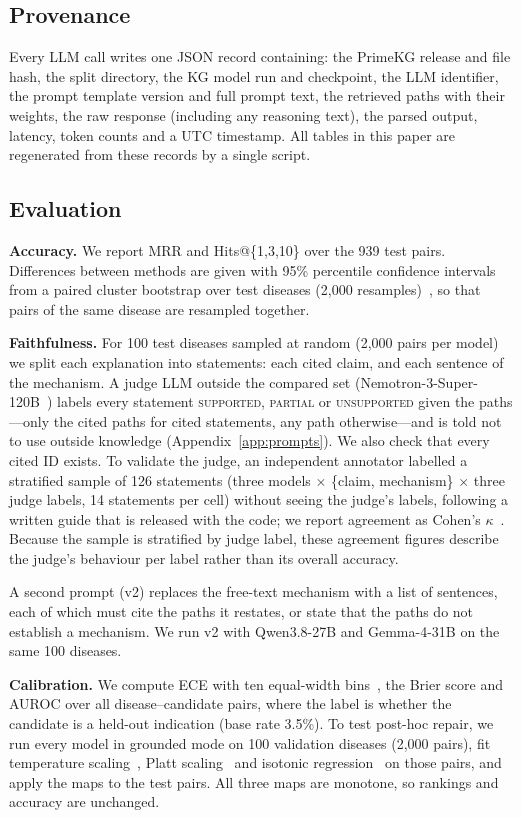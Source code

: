 \documentclass[electronics,article,submit]{Definitions/mdpi}
\begin{document}
\subsection{Provenance}
Every LLM call writes one JSON record containing: the PrimeKG release and file hash, the split directory, the KG model run and checkpoint, the LLM identifier, the prompt template version and full prompt text, the retrieved paths with their weights, the raw response (including any reasoning text), the parsed output, latency, token counts and a UTC timestamp. All tables in this paper are regenerated from these records by a single script.

\subsection{Evaluation}
\textbf{Accuracy.} We report MRR and Hits@\{1,3,10\} over the 939 test pairs. Differences between methods are given with 95\% percentile confidence intervals from a paired cluster bootstrap over test diseases (2,000 resamples)~\cite{efron1993bootstrap}, so that pairs of the same disease are resampled together.

\textbf{Faithfulness.} For 100 test diseases sampled at random (2,000 pairs per model) we split each explanation into statements: each cited claim, and each sentence of the mechanism. A judge LLM outside the compared set (Nemotron-3-Super-120B~\cite{nvidia2026nemotron3super}) labels every statement \textsc{supported}, \textsc{partial} or \textsc{unsupported} given the paths---only the cited paths for cited statements, any path otherwise---and is told not to use outside knowledge (Appendix~\ref{app:prompts}). We also check that every cited ID exists. To validate the judge, an independent annotator labelled a stratified sample of 126 statements (three models $\times$ \{claim, mechanism\} $\times$ three judge labels, 14 statements per cell) without seeing the judge's labels, following a written guide that is released with the code; we report agreement as Cohen's $\kappa$~\cite{cohen1960kappa}. Because the sample is stratified by judge label, these agreement figures describe the judge's behaviour per label rather than its overall accuracy.

A second prompt (v2) replaces the free-text mechanism with a list of sentences, each of which must cite the paths it restates, or state that the paths do not establish a mechanism. We run v2 with Qwen3.8-27B and Gemma-4-31B on the same 100 diseases.

\textbf{Calibration.} We compute ECE with ten equal-width bins~\cite{naeini2015ece}, the Brier score and AUROC over all disease--candidate pairs, where the label is whether the candidate is a held-out indication (base rate 3.5\%). To test post-hoc repair, we run every model in grounded mode on 100 validation diseases (2,000 pairs), fit temperature scaling~\cite{guo2017calibration}, Platt scaling~\cite{platt1999} and isotonic regression~\cite{zadrozny2002} on those pairs, and apply the maps to the test pairs. All three maps are monotone, so rankings and accuracy are unchanged.
\end{document}
